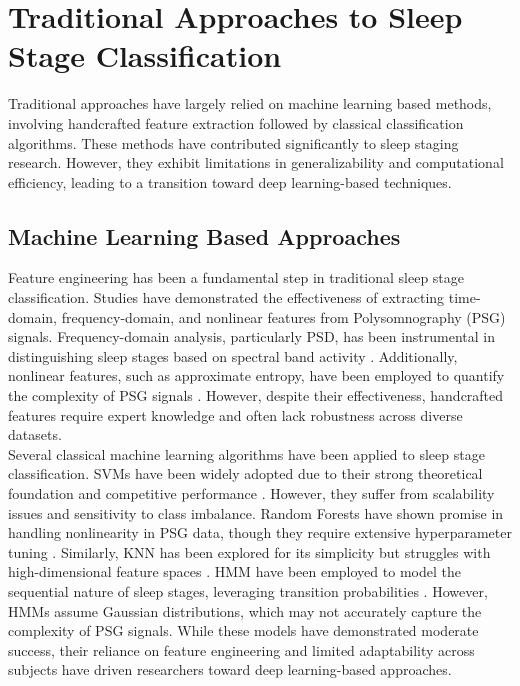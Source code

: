 \section{Traditional Approaches to Sleep Stage Classification}
\label{lit:1}

Traditional approaches have largely relied on machine learning based methods, involving handcrafted feature extraction followed by classical classification algorithms. These methods have contributed significantly to sleep staging research. However, they exhibit limitations in generalizability and computational efficiency, leading to a transition toward deep learning-based techniques.

\subsection{Machine Learning Based Approaches}

Feature engineering has been a fundamental step in traditional sleep stage classification. Studies have demonstrated the effectiveness of extracting time-domain, frequency-domain, and nonlinear features from Polysomnography (PSG) signals. Frequency-domain analysis, particularly \ac{PSD}, has been instrumental in distinguishing sleep stages based on spectral band activity \parencite{prerau2017sleep}. Additionally, nonlinear features, such as approximate entropy, have been employed to quantify the complexity of \acs{PSG} signals \parencite{acharya2018deep}. However, despite their effectiveness, handcrafted features require expert knowledge and often lack robustness across diverse datasets. \\

Several classical machine learning algorithms have been applied to sleep stage classification. \acp{SVM}  have been widely adopted due to their strong theoretical foundation and competitive performance \parencite{lajnef2015learning}. However, they suffer from scalability issues and sensitivity to class imbalance. Random Forests have shown promise in handling nonlinearity in \acs{PSG} data, though they require extensive hyperparameter tuning \parencite{liu2020automatic}. Similarly, \ac{KNN} has been explored for its simplicity but struggles with high-dimensional feature spaces \parencite{qureshi2018human}. \ac{HMM} have been employed to model the sequential nature of sleep stages, leveraging transition probabilities \parencite{doroshenkov2007classification}. However, \acp{HMM} assume Gaussian distributions, which may not accurately capture the complexity of \acs{PSG} signals. While these models have demonstrated moderate success, their reliance on feature engineering and limited adaptability across subjects have driven researchers toward deep learning-based approaches.

